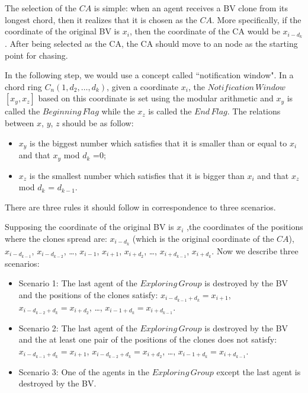 The selection of the $CA$ is simple: when an agent receives a BV clone from its longest chord, then it realizes that it is chosen as the $CA$. More specifically, if the coordinate of the original BV is $x_i$, then the coordinate of the CA would be $x_{i-d_k}$.
After being selected as the CA, the CA should move to an node as the starting point for chasing. 

In the following step, we would use a concept called ``notification window".  In a chord ring $C_n(1, d_2, \ldots, d_k)$, given a coordinate $x_i$, the $Notification\,Window$ $[x_y,x_z]$ based on this coordinate is set using the modular arithmetic and $x_y$ is called the $Beginning\,Flag$ while the $x_z$ is called the $End\,Flag$.
The relations between $x$, $y$, $z$ should be as follow: 
\begin{itemize}
\item $x_y$ is the biggest number which satisfies that it is smaller than or equal to $x_i$ and that $x_y$ mod $d_k$ =$0$; 
\item $x_z$ is the smallest number which satisfies that it is bigger than $x_i$ and that $x_z$ mod $d_k$ = $d_{k-1}$.
\end{itemize} 

There are three rules it should follow in correspondence to three scenarios.  

Supposing the coordinate of the original BV is $x_i$ ,the coordinates of the positions where the clones spread are: $x_{i-d_k}$ (which is the original coordinate of the $CA$), $x_{i-d_{k-1}}$, $x_{i-d_{k-2}}$, \ldots, $x_{i-1}$, $x_{i+1}$, $x_{i+d_2}$, \ldots, $x_{i+d_{k-1}}$, $x_{i+d_{k}}$.
Now we describe three scenarios:
\begin{itemize}
\item Scenario 1: The last agent of the $Exploring\,Group$ is destroyed by the BV and the positions of the clones satisfy: $x_{i-d_{k-1}+d_{k}}=x_{i+1}$, $x_{i-d_{k-2}+d_{k}}=x_{i+d_2}$, \ldots, $x_{{i-1}+d_{k}}=x_{i+d_{k-1}}$. 
\item Scenario 2: The last agent of the $Exploring\,Group$ is destroyed by the BV and the at least one pair of the positions of the clones does not satisfy: $x_{i-d_{k-1}+d_{k}}=x_{i+1}$, $x_{i-d_{k-2}+d_{k}}=x_{i+d_2}$, \ldots, $x_{{i-1}+d_{k}}=x_{i+d_{k-1}}$. 
\item Scenario 3: One of the agents in the $Exploring\,Group$ except the last agent is destroyed by the BV.
\end{itemize}

